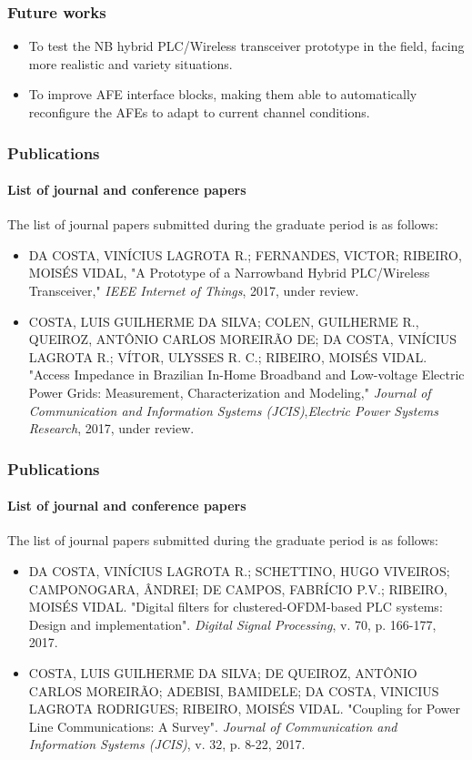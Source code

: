 \documentclass[mathserif]{beamer}
\newcommand{\wait}{\vfill}
\begin{document}
\begin{frame}
\frametitle{Future works}
\begin{itemize}
	\item  To test the NB hybrid PLC/Wireless transceiver prototype in the field, facing more	realistic and variety situations. \wait
	\item To improve AFE interface blocks, making them able to automatically reconfigure	the AFEs to adapt to current channel conditions. \wait
\end{itemize}
\end{frame}

\begin{frame}
	\frametitle{Publications}
	\framesubtitle{List of journal and conference papers}
	The list of journal papers submitted during the graduate period is as follows:
	\small
	\begin{itemize}
		\item DA COSTA, VINÍCIUS LAGROTA R.; FERNANDES, VICTOR; RIBEIRO, MOISÉS VIDAL, "A Prototype of a Narrowband Hybrid PLC/Wireless Transceiver," \linebreak \textit{IEEE Internet of Things}, 2017, under review.
		\item COSTA, LUIS GUILHERME DA SILVA; COLEN, GUILHERME R., QUEIROZ, ANTÔNIO CARLOS MOREIRÃO DE; DA COSTA, VINÍCIUS LAGROTA R.; VÍTOR, ULYSSES R. C.; RIBEIRO, MOISÉS VIDAL. "Access Impedance in Brazilian In-Home Broadband and Low-voltage Electric Power Grids: Measurement, Characterization and Modeling," \textit{Journal of Communication and Information Systems (JCIS)},\textit{Electric Power Systems Research}, 2017, under review.	
	\end{itemize}

\end{frame}

\begin{frame}
\frametitle{Publications}
\framesubtitle{List of journal and conference papers}
	The list of journal papers submitted during the graduate period is as follows:
	\small
	\begin{itemize}
		\item DA COSTA, VINÍCIUS LAGROTA R.; SCHETTINO, HUGO VIVEIROS; CAMPONOGARA, ÂNDREI; DE CAMPOS, FABRÍCIO P.V.; RIBEIRO, MOISÉS VIDAL. "Digital filters for clustered-OFDM-based PLC systems: Design and implementation". \textit{Digital Signal Processing}, v. 70, p. 166-177, 2017.
		
		\item COSTA, LUIS GUILHERME DA SILVA; DE QUEIROZ, ANTÔNIO CARLOS MOREIRÃO; ADEBISI, BAMIDELE; DA COSTA, VINICIUS LAGROTA RODRIGUES; RIBEIRO, MOISÉS VIDAL. "Coupling for Power Line Communications: A Survey". \textit{Journal of Communication and Information Systems (JCIS)}, v. 32, p. 8-22, 2017.
	\end{itemize}	
\end{frame}
\end{document}
